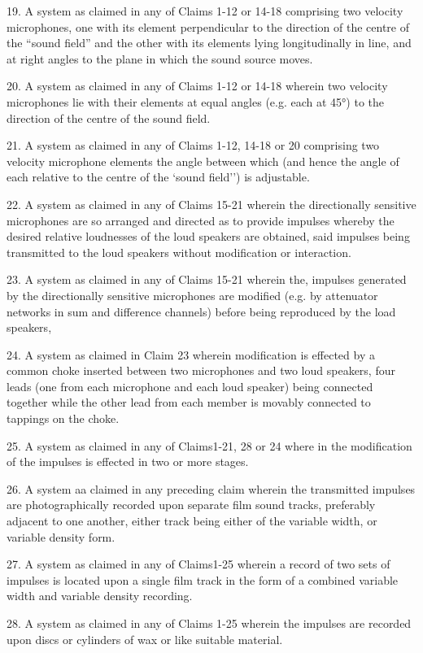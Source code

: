 \documentclass[11pt]{article}
\begin{document}
\begin{multicols*}{2}
19. A system as claimed in any of Claims 1-12 or 14-18 comprising two velocity microphones, one with its element perpendicular to the direction of the centre of the “sound field” and the other with its elements lying longitudinally in line, and at right angles to the plane in which the sound source moves.

20. A system as claimed in any of Claims 1-12 or 14-18 wherein two velocity microphones lie with their elements at equal angles (e.g. each at 45°) to the direction of the centre of the sound field.

21. A system as claimed in any of Claims 1-12, 14-18 or 20 comprising two velocity microphone elements the angle between which (and hence the angle of each relative to the centre of the ‘sound field’’) is adjustable.

22. A system as claimed in any of Claims 15-21 wherein the directionally sensitive microphones are so arranged and directed as to provide impulses whereby the desired relative loudnesses of the loud speakers are obtained, said impulses being transmitted to the loud speakers without modification or interaction. 

23. A system as claimed in any of Claims 15-21 wherein the, impulses generated by the directionally sensitive microphones are modified (e.g. by attenuator networks in sum and difference channels) before being reproduced by the load speakers, 

24. A system as claimed in Claim 23 wherein modification is effected by a common choke inserted between two microphones and two loud speakers, four leads (one from each microphone and each loud speaker) being connected together while the other lead from each member is movably connected to tappings on the choke. 

25. A system as claimed in any of Claims1-21, 28 or 24 where in the modification of the impulses is effected in two or more stages.

26. A system aa claimed in any preceding claim wherein the transmitted impulses are photographically recorded upon separate film sound tracks, preferably adjacent to one another, either track being either of the variable width, or variable density form.

27. A system as claimed in any of Claims1-25 wherein a record of two sets of impulses is located upon a single film track in the form of a combined variable width and variable density recording. 

28. A system as claimed in any of Claims 1-25 wherein the impulses are recorded upon discs or cylinders of wax or like suitable material.


\end{multicols*}
\end{document}
